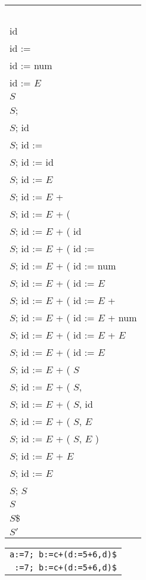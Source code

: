 \begin{slide*}
\begin{minipage}[t]{1.5cm}
\renewcommand{\arraystretch}{0.7}
\begin{small}
\begin{tabular}[t]{l}
~\\
id\\
id :=\\
id := num\\
id := $E$\\
$S$\\
$S$;\\
$S$; id\\
$S$; id :=\\
$S$; id := id\\
$S$; id := $E$\\
$S$; id := $E$ +\\
$S$; id := $E$ + (\\
$S$; id := $E$ + ( id\\
$S$; id := $E$ + ( id :=\\
$S$; id := $E$ + ( id := num\\
$S$; id := $E$ + ( id := $E$\\
$S$; id := $E$ + ( id := $E$ +\\
$S$; id := $E$ + ( id := $E$ + num\\
$S$; id := $E$ + ( id := $E$ + $E$\\
$S$; id := $E$ + ( id := $E$\\
$S$; id := $E$ + ( $S$\\
$S$; id := $E$ + ( $S$,\\
$S$; id := $E$ + ( $S$, id\\
$S$; id := $E$ + ( $S$, $E$\\
$S$; id := $E$ + ( $S$, $E$ )\\
$S$; id := $E$ + $E$\\
$S$; id := $E$\\
$S$; $S$\\
$S$\\
$S$\$\\
$S'$
\end{tabular}
\end{small}
\end{minipage}
\begin{minipage}[t]{4cm}
\renewcommand{\arraystretch}{0.71}
\begin{small}
\begin{tabular}[t]{r}
{\tt a:=7; b:=c+(d:=5+6,d)\$}\\
{\tt :=7; b:=c+(d:=5+6,d)\$}\\

\end{tabular}
\end{small}
\end{minipage}
\end{slide*}
